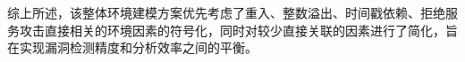 \documentclass[print, master, vlined, timesmath]{DissertUESTC}
\begin{document}
综上所述，该整体环境建模方案优先考虑了重入、整数溢出、时间戳依赖、拒绝服务攻击直接相关的环境因素的符号化，同时对较少直接关联的因素进行了简化，旨在实现漏洞检测精度和分析效率之间的平衡。









\end{document}
